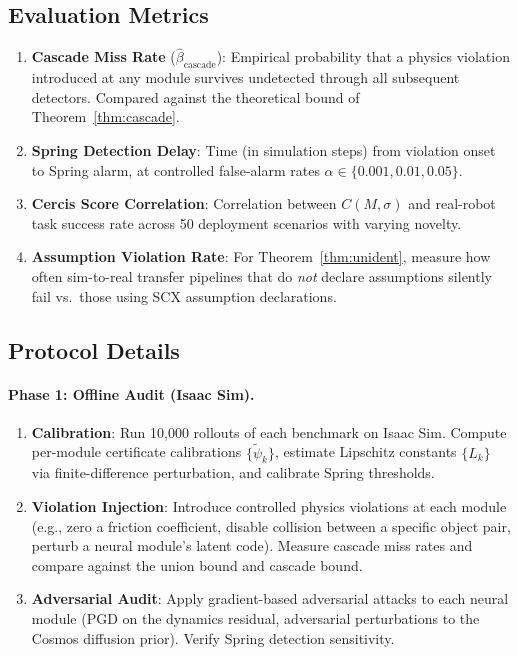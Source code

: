 \documentclass[11pt,twocolumn]{article}
\theoremstyle{definition}
\begin{document}
\subsection{Evaluation Metrics}

\begin{enumerate}[leftmargin=*,nosep]
  \item \textbf{Cascade Miss Rate} ($\hat{\beta}_{\text{cascade}}$):
    Empirical probability that a physics violation introduced at any module
    survives undetected through all subsequent detectors.  Compared against
    the theoretical bound of Theorem~\ref{thm:cascade}.
  \item \textbf{Spring Detection Delay}: Time (in simulation steps) from
    violation onset to Spring alarm, at controlled false-alarm rates
    $\alpha \in \{0.001, 0.01, 0.05\}$.
  \item \textbf{Cercis Score Correlation}: Correlation between $C(M,\sigma)$
    and real-robot task success rate across 50 deployment scenarios with
    varying novelty.
  \item \textbf{Assumption Violation Rate}: For Theorem~\ref{thm:unident},
    measure how often sim-to-real transfer pipelines that do \emph{not}
    declare assumptions silently fail vs.\ those using SCX assumption
    declarations.
\end{enumerate}

\subsection{Protocol Details}

\paragraph{Phase 1: Offline Audit (Isaac Sim).}
\begin{enumerate}[leftmargin=*,nosep]
  \item \textbf{Calibration}: Run 10,000 rollouts of each benchmark on Isaac
    Sim.  Compute per-module certificate calibrations
    $\{\tilde{\psi}_k\}$, estimate Lipschitz constants $\{L_k\}$ via
    finite-difference perturbation, and calibrate Spring thresholds.
  \item \textbf{Violation Injection}: Introduce controlled physics violations
    at each module (e.g., zero a friction coefficient, disable collision
    between a specific object pair, perturb a neural module's latent code).
    Measure cascade miss rates and compare against the union bound and cascade
    bound.
  \item \textbf{Adversarial Audit}: Apply gradient-based adversarial attacks
    to each neural module (PGD on the dynamics residual, adversarial
    perturbations to the Cosmos diffusion prior).  Verify Spring detection
    sensitivity.
\end{enumerate}
\end{document}
